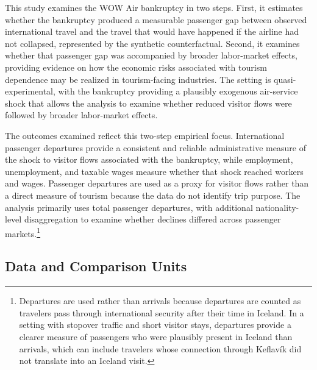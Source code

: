 \documentclass[12pt]{article}
\begin{document}
This study examines the WOW Air bankruptcy in two steps. First, it estimates whether the bankruptcy produced a measurable passenger gap between observed international travel and the travel that would have happened if the airline had not collapsed, represented by the synthetic counterfactual. Second, it examines whether that passenger gap was accompanied by broader labor-market effects, providing evidence on how the economic risks associated with tourism dependence may be realized in tourism-facing industries. The setting is quasi-experimental, with the bankruptcy providing a plausibly exogenous air-service shock that allows the analysis to examine whether reduced visitor flows were followed by broader labor-market effects.

The outcomes examined reflect this two-step empirical focus. International passenger departures provide a consistent and reliable administrative measure of the shock to visitor flows associated with the bankruptcy, while employment, unemployment, and taxable wages measure whether that shock reached workers and wages. Passenger departures are used as a proxy for visitor flows rather than a direct measure of tourism because the data do not identify trip purpose. The analysis primarily uses total passenger departures, with additional nationality-level disaggregation to examine whether declines differed across passenger markets.\footnote{Departures are used rather than arrivals because departures are counted as travelers pass through international security after their time in Iceland. In a setting with stopover traffic and short visitor stays, departures provide a clearer measure of passengers who were plausibly present in Iceland than arrivals, which can include travelers whose connection through Keflavík did not translate into an Iceland visit.} 


\subsection{Data and Comparison Units}\label{sec:data_comparison_units}
\end{document}
